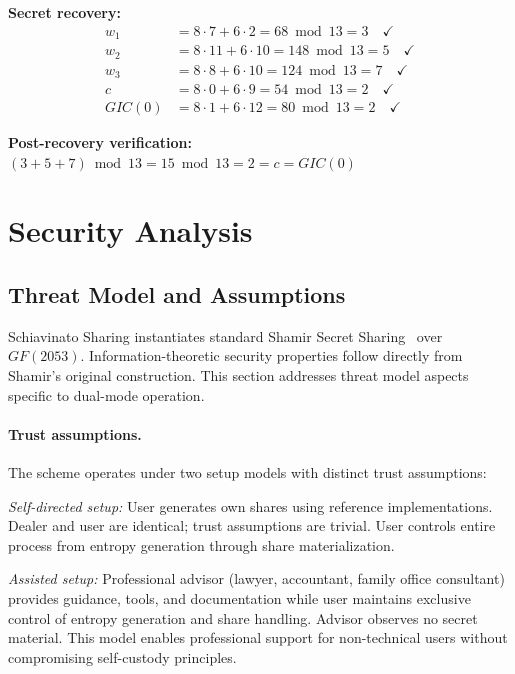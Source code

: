 \documentclass[11pt]{article}
\begin{document}
\textbf{Secret recovery:}
\begin{align*}
w_1 &= 8 \cdot 7 + 6 \cdot 2 = 68 \bmod 13 = 3 \quad \checkmark \\
w_2 &= 8 \cdot 11 + 6 \cdot 10 = 148 \bmod 13 = 5 \quad \checkmark \\
w_3 &= 8 \cdot 8 + 6 \cdot 10 = 124 \bmod 13 = 7 \quad \checkmark \\
c &= 8 \cdot 0 + 6 \cdot 9 = 54 \bmod 13 = 2 \quad \checkmark \\
GIC(0) &= 8 \cdot 1 + 6 \cdot 12 = 80 \bmod 13 = 2 \quad \checkmark
\end{align*}

\textbf{Post-recovery verification:} $(3 + 5 + 7) \bmod 13 = 15 \bmod 13 = 2 = c = GIC(0)$ \quad \checkmark

\section{Security Analysis}
\label{sec:security}

\subsection{Threat Model and Assumptions}

Schiavinato Sharing instantiates standard Shamir Secret Sharing~\cite{shamir1979} over $GF(2053)$. Information-theoretic security properties follow directly from Shamir's original construction. This section addresses threat model aspects specific to dual-mode operation.

\paragraph{Trust assumptions.} The scheme operates under two setup models with distinct trust assumptions:

\textit{Self-directed setup:} User generates own shares using reference implementations. Dealer and user are identical; trust assumptions are trivial. User controls entire process from entropy generation through share materialization.

\textit{Assisted setup:} Professional advisor (lawyer, accountant, family office consultant) provides guidance, tools, and documentation while user maintains exclusive control of entropy generation and share handling. Advisor observes no secret material. This model enables professional support for non-technical users without compromising self-custody principles.
\end{document}
